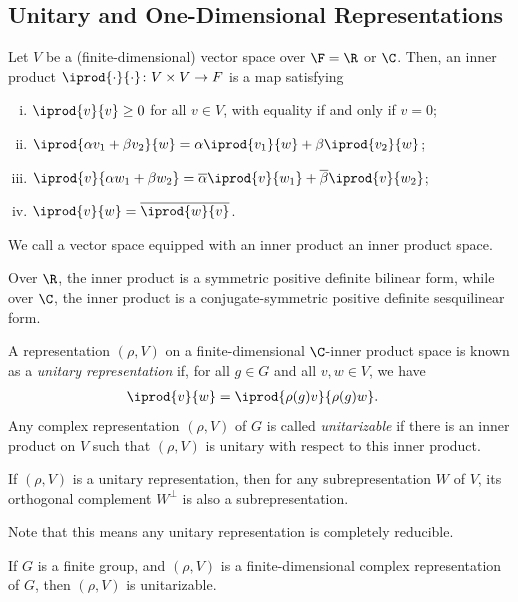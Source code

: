 \documentclass[10pt]{mypackage}
\begin{document}
\subsection{Unitary and One-Dimensional Representations}%
\begin{definition}
  Let $V$ be a (finite-dimensional) vector space over $\F = \R$ or $\C$. Then, an inner product $ \iprod{\cdot}{\cdot}\colon V\times V \rightarrow F $ is a map satisfying
  \begin{enumerate}[(i)]
    \item $ \iprod{v}{v}\geq 0 $ for all $v\in V$, with equality if and only if $v = 0$;
    \item $ \iprod{\alpha v_1 + \beta v_2}{w} = \alpha \iprod{v_1}{w} + \beta \iprod{v_2}{w} $;
    \item $ \iprod{v}{\alpha w_1 + \beta w_2} = \overline{\alpha} \iprod{v}{w_1} + \overline{\beta} \iprod{v}{w_2} $;
    \item $ \iprod{v}{w} = \overline{ \iprod{w}{v} } $.
  \end{enumerate}
  We call a vector space equipped with an inner product an inner product space.
\end{definition}
Over $\R$, the inner product is a symmetric positive definite bilinear form, while over $\C$, the inner product is a conjugate-symmetric positive definite sesquilinear form.
\begin{definition}
  A representation $\left( \rho,V \right)$ on a finite-dimensional $\C$-inner product space is known as a \textit{unitary representation} if, for all $g\in G$ and all $v,w\in V$, we have
  \begin{align*}
    \iprod{v}{w} &= \iprod{\rho(g)v}{\rho(g)w}.
  \end{align*}
  Any complex representation $\left( \rho,V \right)$ of $G$ is called \textit{unitarizable} if there is an inner product on $V$ such that $\left( \rho,V \right)$ is unitary with respect to this inner product.
\end{definition}
\begin{lemma}
  If $\left( \rho,V \right)$ is a unitary representation, then for any subrepresentation $W$ of $V$, its orthogonal complement $W^{\perp}$ is also a subrepresentation.
\end{lemma}
Note that this means any unitary representation is completely reducible.
\begin{theorem}
  If $G$ is a finite group, and $\left( \rho,V \right)$ is a finite-dimensional complex representation of $G$, then $\left( \rho,V \right)$ is unitarizable.
\end{theorem}
\end{document}
